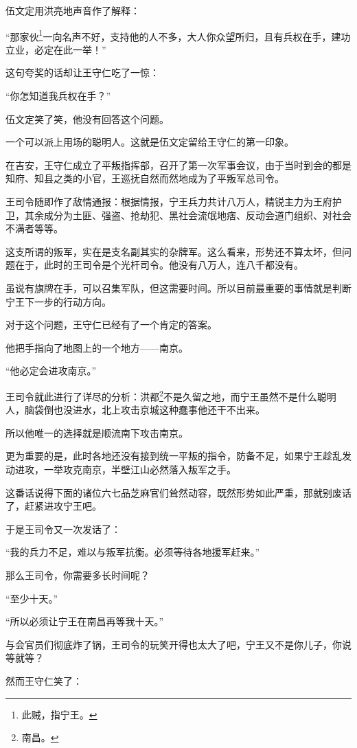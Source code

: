 \begin{multicols}{\theparacolNo}
		伍文定用洪亮地声音作了解释：

		“那家伙\footnote{此贼，指宁王。}一向名声不好，支持他的人不多，大人你众望所归，且有兵权在手，建功立业，必定在此一举！”

		这句夸奖的话却让王守仁吃了一惊：

		“你怎知道我兵权在手？”

		伍文定笑了笑，他没有回答这个问题。

		一个可以派上用场的聪明人。这就是伍文定留给王守仁的第一印象。

		在吉安，王守仁成立了平叛指挥部，召开了第一次军事会议，由于当时到会的都是知府、知县之类的小官，王巡抚自然而然地成为了平叛军总司令。

		王司令随即作了敌情通报：根据情报，宁王兵力共计八万人，精锐主力为王府护卫，其余成分为土匪、强盗、抢劫犯、黑社会流氓地痞、反动会道门组织、对社会不满者等等。

		这支所谓的叛军，实在是支名副其实的杂牌军。这么看来，形势还不算太坏，但问题在于，此时的王司令是个光杆司令。他没有八万人，连八千都没有。

		虽说有旗牌在手，可以召集军队，但这需要时间。所以目前最重要的事情就是判断宁王下一步的行动方向。

		对于这个问题，王守仁已经有了一个肯定的答案。

		他把手指向了地图上的一个地方——南京。

		“他必定会进攻南京。”

		王司令就此进行了详尽的分析：洪都\footnote{南昌。}不是久留之地，而宁王虽然不是什么聪明人，脑袋倒也没进水，北上攻击京城这种蠢事他还干不出来。

		所以他唯一的选择就是顺流南下攻击南京。

		更为重要的是，此时各地还没有接到统一平叛的指令，防备不足，如果宁王趁乱发动进攻，一举攻克南京，半壁江山必然落入叛军之手。

		这番话说得下面的诸位六七品芝麻官们耸然动容，既然形势如此严重，那就别废话了，赶紧进攻宁王吧。

		于是王司令又一次发话了：

		“我的兵力不足，难以与叛军抗衡。必须等待各地援军赶来。”

		那么王司令，你需要多长时间呢？

		“至少十天。”

		“所以必须让宁王在南昌再等我十天。”

		与会官员们彻底炸了锅，王司令的玩笑开得也太大了吧，宁王又不是你儿子，你说等就等？

		然而王守仁笑了：


\end{multicols}
